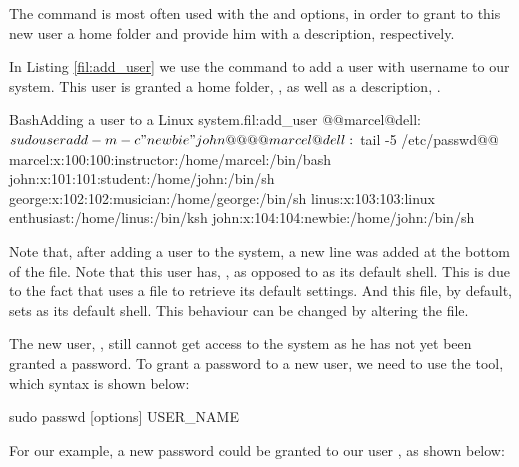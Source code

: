 The  command is most often used with the  and  options, in order to grant to this new user a home folder and provide him with a description, respectively. 

In Listing \ref{fil:add_user} we use the  command to add a user with username  to our system. This user is granted a home folder, , as well as a description, .

\begin{command_line_float}{Bash}{Adding a user to a Linux system.}{fil:add_user}
@@marcel@dell:~$ sudo useradd -m -c "newbie" john @@
@@marcel@dell:~$tail -5 /etc/passwd@@
marcel:x:100:100:instructor:/home/marcel:/bin/bash 
john:x:101:101:student:/home/john:/bin/sh
george:x:102:102:musician:/home/george:/bin/sh
linus:x:103:103:linux enthusiast:/home/linus:/bin/ksh
john:x:104:104:newbie:/home/john:/bin/sh
\end{command_line_float}

Note that, after adding a user to the system, a new line was added at the bottom of the  file. Note that this user has, , as opposed to  as its default shell. This is due to the fact that  uses a file  to retrieve its default settings. And this file, by default, sets  as its default shell. This behaviour can be changed by altering the  file.

The new user, , still cannot get access to the system as he has not yet been granted a password. To grant a password to a new user, we need to use the  tool, which syntax is shown below:
\begin{command_line}
sudo passwd [options] USER_NAME
\end{command_line}

For our example, a new password could be granted to our user , as shown below:
 

